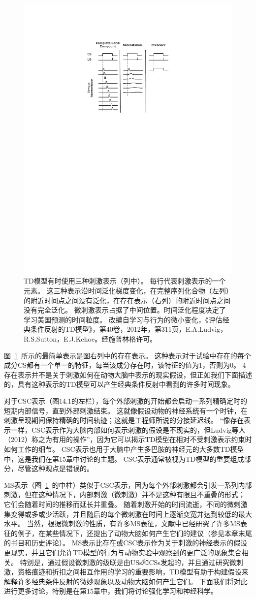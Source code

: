 {{{{{{{{{{{{{{{{{{\begin{figure}[!htb]
	\centering
	\includegraphics[width=0.5\linewidth]{chap11/fig_11_1}
	\caption{TD模型有时使用三种刺激表示（列中）。
		每行代表刺激表示的一个元素。
		这三种表示沿时间泛化梯度变化，在完整序列化合物（左列）的附近时间点之间没有泛化，在存在表示（右列）的附近时间点之间没有完全泛化。
		微刺激表示占据了中间位置。时间泛化程度决定了学习美国预测的时间粒度。
		改编自学习与行为的微小变化，《评估经典条件反射的TD模型》，第40卷，2012年，第311页，E.A.Ludvig，R.S.Sutton，E.J.Kehoe。经施普林格许可。  \label{fig:11_1}}
\end{figure}

图~\ref{fig:11_1}~所示的最简单表示是图右列中的存在表示。
这种表示对于试验中存在的每个成分CS都有一个单一的特征，每当该成分存在时，该特征的值为1，否则为0。
4存在表示并不是关于刺激如何在动物大脑中表示的现实假设，但正如我们下面描述的，具有这种表示的TD模型可以产生经典条件反射中看到的许多时间现象。


对于CSC表示（图14.1的左栏），每个外部刺激的开始都会启动一系列精确定时的短期内部信号，直到外部刺激结束。
这就像假设动物的神经系统有一个时钟，在刺激呈现期间保持精确的时间轨迹；这就是工程师所说的分接延迟线。
“像存在表示一样，CSC表示作为大脑内部如何表示刺激的假设是不现实的，但Ludvig等人（2012）称之为有用的操作”，因为它可以揭示TD模型在相对不受刺激表示约束时如何工作的细节。
CSC表示也用于大脑中产生多巴胺的神经元的大多数TD模型中，这是我们在第15章中讨论的主题。
CSC表示通常被视为TD模型的重要组成部分，尽管这种观点是错误的。


MS表示（图~\ref{fig:11_1}~的中柱）类似于CSC表示，因为每个外部刺激都会引发一系列内部刺激，但在这种情况下，内部刺激（微刺激）并不是这种有限且不重叠的形式；
它们会随着时间的推移而延长并重叠。
随着刺激开始的时间流逝，不同的微刺激集变得或多或少活跃，并且随后的每个微刺激在时间上逐渐变宽并达到较低的最大水平。
当然，根据微刺激的性质，有许多MS表征，文献中已经研究了许多MS表征的例子，在某些情况下，还提出了动物大脑如何产生它们的建议（参见本章末尾的书目和历史评论）。
MS表示比存在或CSC表示作为关于刺激的神经表示的假设更现实，并且它们允许TD模型的行为与动物实验中观察到的更广泛的现象集合相关。
特别是，通过假设微刺激的级联是由USs和CSs发起的，并且通过研究微刺激，资格痕迹和折扣之间相互作用的学习的重要影响，TD模型有助于构建假设来解释许多经典条件反射的微妙现象以及动物大脑如何产生它们。
下面我们将对此进行更多讨论，特别是在第15章中，我们将讨论强化学习和神经科学。


}}}}}}}}}}}}}}}}}}
